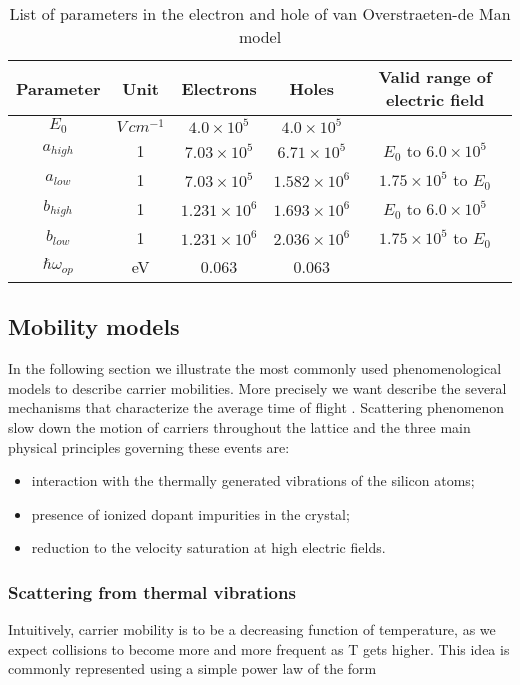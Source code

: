 \begin{table}[!h]
\centering
\begin{tabular}{ccccc}
\toprule
Parameter & Unit & Electrons & Holes  & Valid range of electric field\\
\midrule
$E_0$ & $V \, cm^{-1}$ & $4.0 \times 10^{5}$ & $4.0 \times 10^{5}$ & \\
$a_{high}$ & 1 & $7.03 \times 10^{5}$ & $6.71 \times 10^{5}$ & $E_0$ to $6.0 \times 10^{5}$\\
$a_{low}$ & 1 & $7.03 \times 10^{5}$ & $1.582 \times 10^{6}$ & $1.75 \times 10^{5}$ to $E_0$\\
$b_{high}$ & 1 & $1.231 \times 10^{6}$ & $1.693 \times 10^{6}$ & $E_0$ to $6.0 \times 10^{5}$\\
$b_{low}$ & 1 & $1.231 \times 10^{6}$ & $2.036 \times 10^{6}$ &$1.75 \times 10^{5}$ to $E_0$\\
$\hbar\omega_{op}$ & eV & 0.063 & 0.063\\
\bottomrule
\end{tabular}
\caption{List of parameters in the electron and hole of van Overstraeten-de Man model}
\end{table}

\subsection{Mobility models}

In the following section we illustrate the most commonly used phenomenological models to describe carrier mobilities. More precisely we want describe  the several mechanisms that characterize the average time of flight .
Scattering phenomenon slow down the motion of carriers throughout the lattice and the three main physical principles governing these events are:
\begin{itemize}
\item interaction with the thermally generated vibrations of the silicon atoms;
\item presence of ionized dopant impurities in the crystal;
\item reduction to the velocity saturation at high electric fields.
\end{itemize}

\subsubsection{Scattering from thermal vibrations}


Intuitively, carrier mobility is to be a decreasing function of temperature, as we expect collisions to become more and more frequent as T gets higher. This idea is commonly represented using a simple power law of the form

